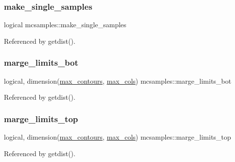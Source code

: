 \subsubsection{\texorpdfstring{make\+\_\+single\+\_\+samples}{make\_single\_samples}}
{\footnotesize\ttfamily logical mcsamples\+::make\+\_\+single\+\_\+samples}



Referenced by getdist().

\mbox{\label{namespacemcsamples_a6c36f035fe1ec1e688afcc0ac112e425}} 
\subsubsection{\texorpdfstring{marge\+\_\+limits\+\_\+bot}{marge\_limits\_bot}}
{\footnotesize\ttfamily logical, dimension(\mbox{\hyperlink{namespacemcsamples_a878ea2f4d47feda9ed7a1701aabfb0d1}{max\+\_\+contours}}, \mbox{\hyperlink{namespacemcsamples_ae8386bad918d8af8d203683c01d5818c}{max\+\_\+cols}}) mcsamples\+::marge\+\_\+limits\+\_\+bot}



Referenced by getdist().

\mbox{\label{namespacemcsamples_a22f55004d2d1debc557bf626e9b2af89}} 
\subsubsection{\texorpdfstring{marge\+\_\+limits\+\_\+top}{marge\_limits\_top}}
{\footnotesize\ttfamily logical, dimension(\mbox{\hyperlink{namespacemcsamples_a878ea2f4d47feda9ed7a1701aabfb0d1}{max\+\_\+contours}}, \mbox{\hyperlink{namespacemcsamples_ae8386bad918d8af8d203683c01d5818c}{max\+\_\+cols}}) mcsamples\+::marge\+\_\+limits\+\_\+top}



Referenced by getdist().

\mbox{\label{namespacemcsamples_ad7bc69baf30e862c773070e99974d483}} 
